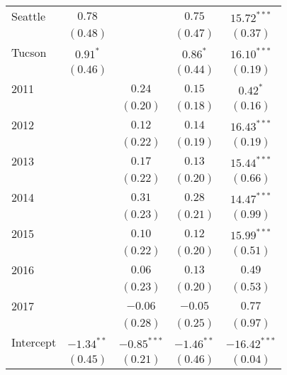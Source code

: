 \begin{table}[ht!]
\begin{center}
\begin{tabular}{l c c c c}
Seattle                    & $0.78$       &               & $0.75$       & $15.72^{***}$  \\
                           & $(0.48)$     &               & $(0.47)$     & $(0.37)$       \\
Tucson                     & $0.91^{*}$   &               & $0.86^{*}$   & $16.10^{***}$  \\
                           & $(0.46)$     &               & $(0.44)$     & $(0.19)$       \\
2011                       &              & $0.24$        & $0.15$       & $0.42^{*}$     \\
                           &              & $(0.20)$      & $(0.18)$     & $(0.16)$       \\
2012                       &              & $0.12$        & $0.14$       & $16.43^{***}$  \\
                           &              & $(0.22)$      & $(0.19)$     & $(0.19)$       \\
2013                       &              & $0.17$        & $0.13$       & $15.44^{***}$  \\
                           &              & $(0.22)$      & $(0.20)$     & $(0.66)$       \\
2014                       &              & $0.31$        & $0.28$       & $14.47^{***}$  \\
                           &              & $(0.23)$      & $(0.21)$     & $(0.99)$       \\
2015                       &              & $0.10$        & $0.12$       & $15.99^{***}$  \\
                           &              & $(0.22)$      & $(0.20)$     & $(0.51)$       \\
2016                       &              & $0.06$        & $0.13$       & $0.49$         \\
                           &              & $(0.23)$      & $(0.20)$     & $(0.53)$       \\
2017                       &              & $-0.06$       & $-0.05$      & $0.77$         \\
                           &              & $(0.28)$      & $(0.25)$     & $(0.97)$       \\
Intercept                  & $-1.34^{**}$ & $-0.85^{***}$ & $-1.46^{**}$ & $-16.42^{***}$ \\
                           & $(0.45)$     & $(0.21)$      & $(0.46)$     & $(0.04)$       \\

\end{tabular}
\end{center}
\end{table}
